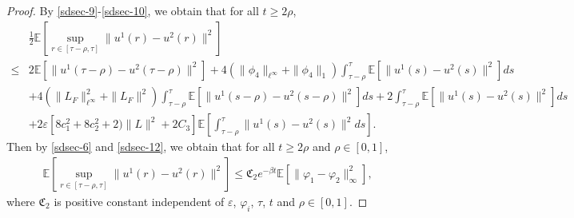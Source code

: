 \documentclass[11pt]{article}
\numberwithin{equation}{section}
\theoremstyle{plain}
\begin{document}
\begin{proof}
 By \eqref{sdsec-9}-\eqref{sdsec-10}, we obtain that for all $t \ge 2\rho$,
 \begin{align} \label{sdsec-12}
  	   & \frac{1}{2} \mathbb{E} 
  	             \left[ \sup_{r \in [\tau-\rho, \tau] } 
  	                         \| u^1(r) - u^2(r) \|^2  
  	             \right]  \nonumber\\
\le & 2 \mathbb{E} 
                   \left[ \|  u^1(\tau-\rho) - u^2(\tau-\rho) \|^2 \right] 
             + 4 \left( \|\phi_{4}\|_{\ell^\infty} + \|\phi_{4}\|_1 \right)
                     	                                          \int_{\tau-\rho}^{\tau} 
                     	                                               \mathbb{E} \left[ \|u^1(s) - u^2(s) \|^2 \right] 
                     	                                           ds  \nonumber\\
        & + 4 \left( \|L_{F}\|_{\ell^\infty}^2 + \|L_{F}\|^2 \right)
                              \int_{\tau-\rho}^{\tau} 
                                   \mathbb{E}
                                        \left[ \| u^1(s-\rho) - u^2(s-\rho) \|^2 
                                        \right] 
                              ds 
            + 2 \int_{\tau-\rho}^{\tau} 
                                                \mathbb{E}
                                                     \left[ \| u^1(s) - u^2(s) \|^2 
                                                     \right] 
                   ds  \nonumber\\     
  	   & + 2 \varepsilon 
  	    	           \left[ 8 c_1^2 + 8 c_2^2 + 2 ) \| L \|^2 
  	    	                    + 2C_3
  	                  \right]
  	           \mathbb{E}
  	                \left[  \int_{\tau-\rho}^{\tau} 
  	                              \|u^1(s) - u^2(s) \|^2 ds
  	                \right].               
 \end{align}
 Then by \eqref{sdsec-6} and \eqref{sdsec-12}, we obtain that for all $t \ge 2\rho$ and $\rho \in [0,1]$, 
  \begin{align*}
   	    \mathbb{E} 
   	             \left[  \sup_{r \in [\tau-\rho, \tau] } \| u^1(r) - u^2(r) \|^2  
   	             \right] 
   \le \mathfrak{C}_2 
                e^{ -\beta t} 
    	                    \mathbb{E}
    	                           \left[ \| \varphi_1 - \varphi_2 \|_\infty^2
    	                           \right],           
  \end{align*}
 where $\mathfrak{C}_2$ is positive constant independent of $\varepsilon$, $\varphi_i$, $\tau$, $t$ and $\rho \in [0,1]$.
\end{proof}
\end{document}

